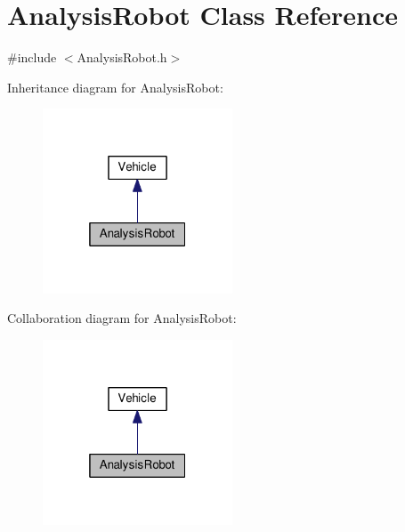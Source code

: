 \hypertarget{class_analysis_robot}{\section{Analysis\-Robot Class Reference}
\label{class_analysis_robot}
}


{\ttfamily \#include $<$Analysis\-Robot.\-h$>$}



Inheritance diagram for Analysis\-Robot\-:
\nopagebreak
\begin{figure}[H]
\begin{center}
\leavevmode
\includegraphics[width=160pt]{class_analysis_robot__inherit__graph}
\end{center}
\end{figure}


Collaboration diagram for Analysis\-Robot\-:
\nopagebreak
\begin{figure}[H]
\begin{center}
\leavevmode
\includegraphics[width=160pt]{class_analysis_robot__coll__graph}
\end{center}
\end{figure}
